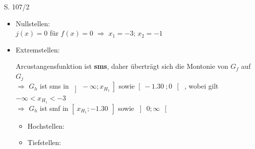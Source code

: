 \begin{Exercise}{S. 107/2}{}
\begin{enumerate}[label=\arabic*.,leftmargin=*]
{\begin{itemize}[leftmargin=*]
{\begin{align*}
                    \lim\limits_{x \to 0^{-}} \arctan\left(\overbrace{f(x)}^{\textcolor{myg}{+ \infty}} \right) &= + {\dfrac{\pi}{2}}^{+}; \qquad \qquad &\lim\limits_{x \to 0^{+}} \arctan\left(\overbrace{f(x)}^{\textcolor{myg}{+ \infty}} \right) &= + {\dfrac{\pi}{2}}^{+} && \\[-2.0ex]
                \end{align*}
                }
            \item Nullstellen: \\[1.0ex]{
                $j(x) = 0$ für $f(x) = 0$ \qquad $\Rightarrow$ \quad $x_{1} = -3$; \quad $x_{2} = -1$\\[-2.0ex]
                }
            \item Extremstellen: \\[1.0ex]{
                Arcustangensfunktion ist \textbf{sms}, daher überträgt sich die Montonie von $G_{f}$ auf $G_{j}$\\[1.0ex]
                $\Rightarrow$ \quad $G_{h}$ ist sms in $\left] \ -\infty; x_{H_{1}} \ \right]$ sowie $\left[ \ -\SI{1.30}{}; 0 \ \right[$ \quad, wobei gilt $-\infty < x_{H_{1}} < -3$ \\[1.0ex]
                $\Rightarrow$ \quad $G_{h}$ ist smf in $\left[ \ x_{H_{1}} ; -\SI{1.30}{} \ \right]$ sowie $\left] \ 0; \infty \ \right[$ \\[-2.0ex]
                \begin{itemize}
                    \item Hochstellen: 
                    \item Tiefstellen: 
                \end{itemize}
                }
        \end{itemize}
        }
\end{enumerate}
\end{Exercise}

